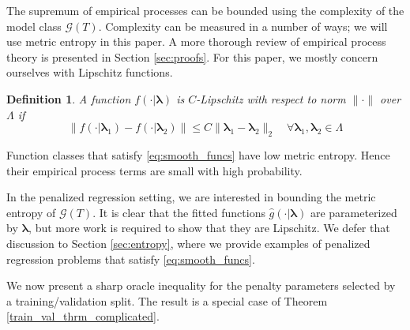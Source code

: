 \documentclass[12pt]{article}
\newtheorem{definition}{Definition}
\begin{document}
The supremum of empirical processes can be bounded using the complexity of the model class $\mathcal{G}(T)$. Complexity can be measured in a number of ways; we will use metric entropy in this paper. A more thorough review of empirical process theory is presented in Section \ref{sec:proofs}. For this paper, we mostly concern ourselves with Lipschitz functions.
\begin{definition}
\label{def:smooth_funcs}
A function $f(\cdot | \boldsymbol{\lambda})$ is $C$-Lipschitz with respect to norm $\| \cdot \|$ over $\Lambda$ if
\begin{equation}
\left \| f(\cdot | \boldsymbol \lambda_1) - f(\cdot | \boldsymbol \lambda_2) \right \|
\le
C \| \boldsymbol \lambda_1 - \boldsymbol \lambda_2 \|_2 
\quad
\forall \boldsymbol \lambda_1,\boldsymbol \lambda_2 \in \Lambda
\label{eq:smooth_funcs}
\end{equation}
\end{definition}
Function classes that satisfy \eqref{eq:smooth_funcs} have low metric entropy. Hence their empirical process terms are small with high probability.

In the penalized regression setting, we are interested in bounding the metric entropy of $\mathcal{G}(T)$. It is clear that the fitted functions $\hat{g}(\cdot | \boldsymbol \lambda)$ are parameterized by $\boldsymbol \lambda$, but more work is required to show that they are Lipschitz. We defer that discussion to Section \ref{sec:entropy}, where we provide examples of penalized regression problems that satisfy \ref{eq:smooth_funcs}.

We now present a sharp oracle inequality for the penalty parameters selected by a training/validation split. The result is a special case of Theorem \ref{train_val_thrm_complicated}.
\end{document}
